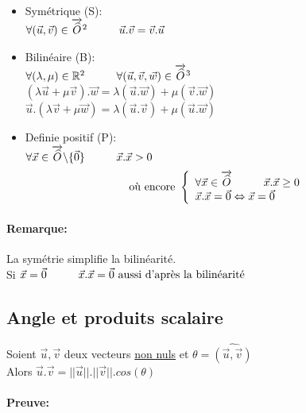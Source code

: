 \documentclass{article}
\newcommand\tab[1][1cm]{\hspace*{#1}}
\begin{document}
\begin{itemize}
    \item Symétrique (S): \\
$\forall(\vec{u}, \vec{v}) \in \overrightarrow{\widehat{O}}^2 \tab \vec{u}.\vec{v} = \vec{v}.\vec{u}$

    \item Bilinéaire (B): \\
$\forall(\lambda, \mu) \in \mathbb{R}^2 \tab \forall(\vec{u}, \vec{v}, \vec{w}) \in \overrightarrow{\widehat{O}}^3$ \\
\tab $(\lambda\vec{u} + \mu\vec{v}).\vec{w} = \lambda(\vec{u}.\vec{w}) + \mu(\vec{v}.\vec{w})$ \\
\tab $\vec{u}.(\lambda\vec{v} + \mu\vec{w}) = \lambda(\vec{u}.\vec{v}) + \mu(\vec{u}.\vec{w})$

    \item Definie positif (P): \\
$\forall\vec{x} \in \overrightarrow{\widehat{O}} \backslash \{\vec{0}\} \tab \vec{x}.\vec{x} > 0$
$$
\mbox{ où encore }
\left\{
    \begin{array}{ll}
        \forall\vec{x} \in \overrightarrow{\widehat{O}} \tab \vec{x}.\vec{x} \geq 0 \\
        \vec{x}.\vec{x} = \vec{0} \Leftrightarrow \vec{x} = \vec{0}
    \end{array}
\right.
$$

\end{itemize}

\paragraph{Remarque:}

La symétrie simplifie la bilinéarité. \\
Si $\vec{x} = \vec{0} \tab \vec{x}.\vec{x} = \vec{0} \mbox{ aussi d'après la bilinéarité}$

\subsection{Angle et produits scalaire}

Soient $\vec{u}, \vec{v}$ deux vecteurs \underline{non nuls} et $\theta = \widehat{(\vec{u},\vec{v})}$ \\
Alors $\vec{u}.\vec{v} = ||\vec{u}||.||\vec{v}||.cos(\theta)$

\paragraph{Preuve:}
\end{document}
